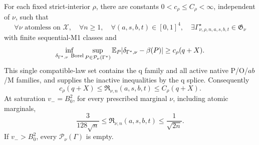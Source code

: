 \begin{proposition}
\label{prop:fixed-nu-lower}
For each fixed strict-interior \(\rho\), there are constants
\(0<c_\rho\le C_\rho<\infty\), independent of \(\nu\), such that
\[
 \forall\nu\text{ atomless on }\mathcal X,\quad
 \forall n\ge1,\quad\forall(a,s,b,t)\in[0,1]^4,\quad
 \exists\Gamma^\star_{\nu,\rho,n,a,s,b,t}\in\mathfrak G_\nu
\]
with finite sequential-M1 classes and
\begin{equation}
 \inf_{\delta_{\Gamma^\star,\nu}\ {\rm Borel}}
 \sup_{P\in\mathcal P_\nu(\Gamma^\star)}
 \mathbb E_P|\delta_{\Gamma^\star,\nu}-\beta(P)|
 \ge c_\rho(q+X).
 \label{eq:fixed-nu-same-pair}
\end{equation}
This single compatible-law set contains the q family and all active native
P/O/\(ab\)/M families, and supplies the inactive inequalities by the q
splice.  Consequently
\[
 c_\rho(q+X)\le\mathfrak R_{\nu,n}(a,s,b,t)
 \le C_\rho(q+X).
\]
At saturation \(v_-=B_0^2\), for every prescribed marginal \(\nu\),
including atomic marginals,
\[
 \frac{3}{128\sqrt n}\le\mathfrak R_{\nu,n}(a,s,b,t)
 \le\frac1{\sqrt{2n}}.
\]
If \(v_->B_0^2\), every \(\mathcal P_\nu(\Gamma)\) is empty.
\end{proposition}

